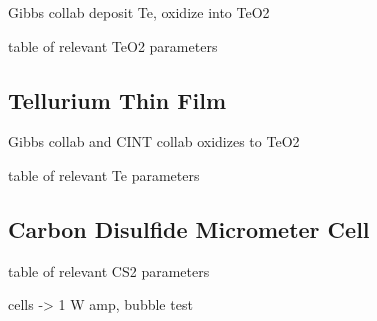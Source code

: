Gibbs collab
deposit Te, oxidize into TeO2

table of relevant TeO2 parameters

\subsection{Tellurium Thin Film}
\label{subsec:Raman:Target:Te}

Gibbs collab and CINT collab
oxidizes to TeO2

table of relevant Te parameters

\subsection{Carbon Disulfide Micrometer Cell}
\label{subsec:Raman:Target:CS2Cells}

table of relevant CS2 parameters

cells -> 1 W amp, bubble test

